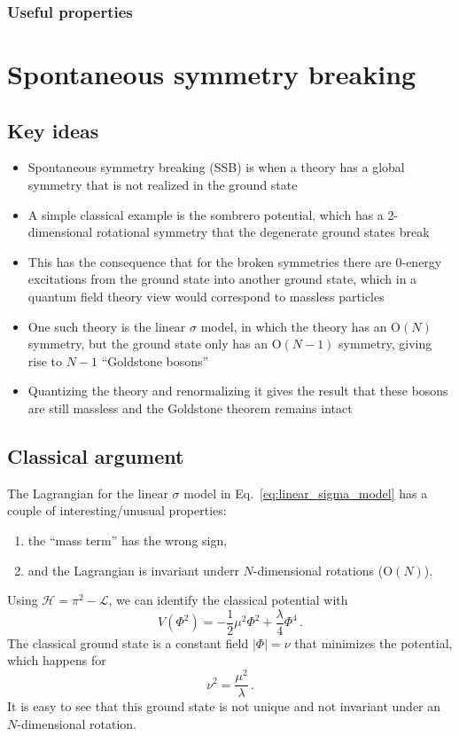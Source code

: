 \documentclass[12pt]{memoir}
\begin{document}
\subsection{Useful properties}

\chapter{Spontaneous symmetry breaking}

\section{Key ideas}

\begin{itemize}
  \item Spontaneous symmetry breaking (SSB) is when a theory has a global symmetry
    that is not realized in the ground state
  \item A simple classical example is the sombrero potential,
    which has a 2-dimensional rotational symmetry that the degenerate ground states break
  \item This has the consequence that for the broken symmetries
    there are 0-energy excitations from the ground state into another ground state,
    which in a quantum field theory view would correspond to massless particles
  \item One such theory is the linear $\sigma$ model,
    in which the theory has an $\text{O}(N)$ symmetry,
    but the ground state only has an $\text{O}(N-1)$ symmetry,
    giving rise to $N-1$ ``Goldstone bosons''
  \item Quantizing the theory and renormalizing it gives the result that
    these bosons are still massless and the Goldstone theorem remains intact
\end{itemize}

\section{Classical argument}

The Lagrangian for the linear $\sigma$ model in Eq.~\ref{eq:linear_sigma_model} has a couple of interesting/unusual properties:
\begin{enumerate}
  \item the ``mass term'' has the wrong sign,
  \item and the Lagrangian is invariant underr $N$-dimensional rotations ($\text{O}(N)$).
\end{enumerate}
Using $\mathcal{H} = \pi^2 - \mathcal{L}$, we can identify the classical potential with
\begin{equation}
  V(\Phi^2) = - \frac{1}{2} \mu^2 \Phi^2 + \frac{\lambda}{4} \Phi^4\,.
\end{equation}
The classical ground state is a constant field $\lvert\Phi\rvert = \nu$ that minimizes the potential,
which happens for
\begin{equation}
  \nu^2 = \frac{\mu^2}{\lambda}\,.
\end{equation}
It is easy to see that this ground state is not unique and not invariant under an $N$-dimensional rotation.
\end{document}
